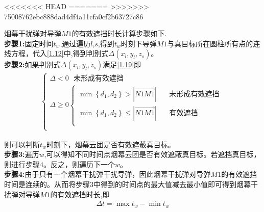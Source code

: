 \documentclass[../main.tex]{subfiles}
\begin{document}
<<<<<<< HEAD
=======
>>>>>>> 75008762ebc888dad4df4a11cfa0cf2b63727c86
  
烟幕干扰弹对导弹$M1$的有效遮挡时长计算步骤如下.
\\
\textbf{步骤1:}固定时间$t_w$,通过遍历$l$,$s$,得到$t_w$时刻下导弹$M1$与真目标所在圆柱所有点的连线方程，代入\eqref{1.12}中,得到判别式$\Delta \left( x_l,y_l,z_s \right)$。
\\
\textbf{步骤2:}如果判别式$\Delta \left( x_l,y_l,z_s \right)$满足\eqref{1.19}即
\begin{align}\label{1.19}
	\left\{ \begin{array}{l}
	\varDelta <0\ \ \ \text{未形成有效遮挡}\\
	\varDelta \ge 0\left\{ \begin{array}{l}
	\min \left\{ d_1,d_2 \right\} >\left| \overrightarrow{N1M1} \right|\ \ \ \ \ \ \ \ \text{未形成有效遮挡}\\
	\min \left\{ d_1,d_2 \right\} \le \left| \overrightarrow{N1M1} \right|\ \ \ \ \ \ \ \ \text{有效遮挡}\\
\end{array} \right.\\
\end{array} \right. 
\end{align}
\par 则可以判断$t_w$时刻下，烟幕云团是否有效遮蔽真目标。
\\
\textbf{步骤3:}遍历$w$,可以得知不同时间点烟幕云团是否有效遮蔽真目标。若遮挡真目标，则进行步骤4。反之，则遍历下一个$w$。
\\
\textbf{步骤4:}由于只有一个烟幕干扰弹干扰导弹，因此烟幕干扰弹对导弹$M1$的有效遮挡时间是连续的。从而将步骤3中得到的时间点的最大值减去最小值即可得到烟幕干扰弹对导弹$M1$的有效遮挡时长,即
\begin{align}\label{1.189}
	\varDelta t=\max t_w-\min t_w
\end{align}
\end{document}
